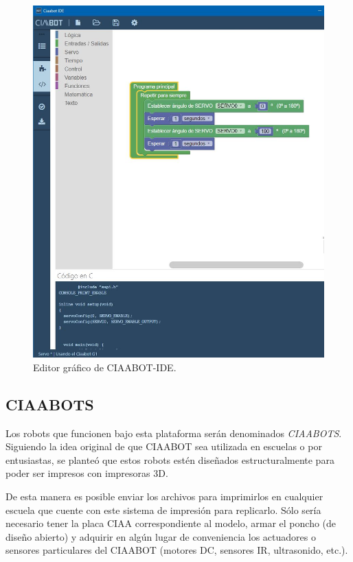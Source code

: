 \begin{figure}[h]
	\centering
	\includegraphics[scale=.5]{./Figures/ciaabot-ide-bloques.jpg}
	\caption{Editor gráfico de CIAABOT-IDE.}
	\label{fig:ciaabot:ide}
\end{figure}

\subsection{CIAABOTS}
\label{subsec:ciaabots}
Los robots que funcionen bajo esta plataforma serán denominados \emph{CIAABOTS}. Siguiendo la idea original de que CIAABOT sea utilizada en escuelas o por entusiastas, se planteó que estos robots estén diseñados estructuralmente para poder ser impresos con impresoras 3D.

De esta manera es posible enviar los archivos para imprimirlos en cualquier escuela que cuente con este sistema de impresión para replicarlo. Sólo sería necesario tener la placa CIAA correspondiente al modelo, armar el poncho (de diseño abierto) y adquirir en algún lugar de conveniencia los actuadores o sensores particulares del CIAABOT (motores DC, sensores IR, ultrasonido, etc.).


